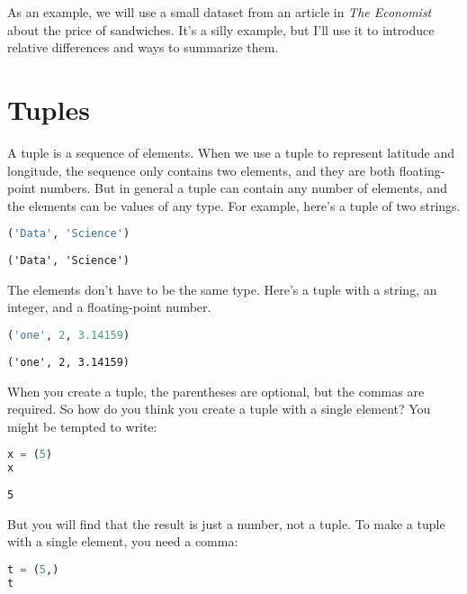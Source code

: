 \documentclass[
]{book}
\begin{document}
As an example, we will use a small dataset from an article in \emph{The
Economist} about the price of sandwiches. It's a silly example, but I'll
use it to introduce relative differences and ways to summarize them.

\section{Tuples}\label{tuples}

A tuple is a sequence of elements. When we use a tuple to represent
latitude and longitude, the sequence only contains two elements, and
they are both floating-point numbers. But in general a tuple can contain
any number of elements, and the elements can be values of any type. For
example, here's a tuple of two strings.

\begin{lstlisting}[language=Python]
('Data', 'Science')
\end{lstlisting}

\begin{lstlisting}
('Data', 'Science')
\end{lstlisting}

The elements don't have to be the same type. Here's a tuple with a
string, an integer, and a floating-point number.

\begin{lstlisting}[language=Python]
('one', 2, 3.14159)
\end{lstlisting}

\begin{lstlisting}
('one', 2, 3.14159)
\end{lstlisting}

When you create a tuple, the parentheses are optional, but the commas
are required. So how do you think you create a tuple with a single
element? You might be tempted to write:

\begin{lstlisting}[language=Python]
x = (5)
x
\end{lstlisting}

\begin{lstlisting}
5
\end{lstlisting}

But you will find that the result is just a number, not a tuple. To make
a tuple with a single element, you need a comma:

\begin{lstlisting}[language=Python]
t = (5,)
t
\end{lstlisting}
\end{document}
